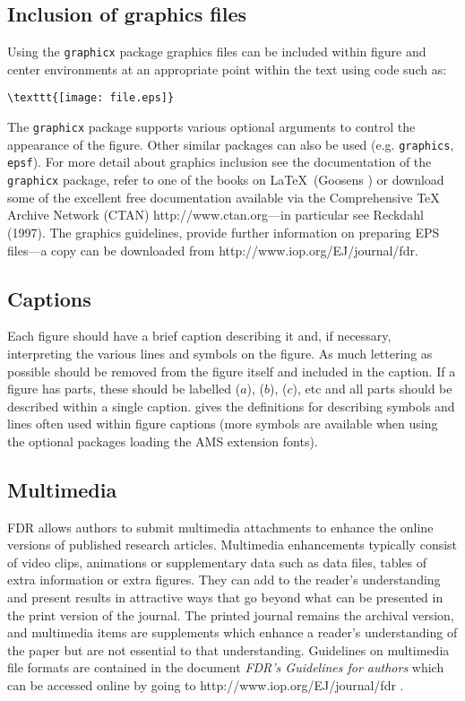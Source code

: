 \documentclass[12pt]{iopart}
\begin{document}
\subsection{Inclusion of graphics files\label{figinc}}
Using the \verb"graphicx" package graphics files can 
be included within figure and center environments at an 
appropriate point within the text using code such as:
\small\begin{verbatim}
\texttt{[image: file.eps]}
\end{verbatim}\normalsize
The \verb"graphicx" package supports various optional arguments
to control the appearance of the figure. Other similar 
packages can also be used (e.g. \verb"graphics", \verb"epsf"). 
For more detail about graphics inclusion see the documentation 
of the \verb"graphicx" package, refer to one of the books on \LaTeX\ (Goosens ) 
or download some of the excellent free documentation available via the Comprehensive
TeX Archive Network (CTAN) http://www.ctan.org---{in particular see Reckdahl (1997)}.
The graphics guidelines, provide further information on preparing EPS files---a copy
can be downloaded from http://www.iop.org/EJ/journal/fdr.

\subsection{Captions}
Each figure should have a brief caption describing it and, if 
necessary, interpreting the various lines and symbols on the figure. 
As much lettering as possible should be removed from the figure itself 
and included in the caption. If a figure has parts, these should be 
labelled ($a$), ($b$), ($c$), etc and all parts should be described 
within a single caption.  gives the definitions for describing 
symbols and lines often used within figure captions (more symbols are 
available when using the optional packages loading the AMS extension fonts).

\subsection{Multimedia}
FDR allows authors to submit multimedia attachments to 
enhance the online versions of published research articles. Multimedia 
enhancements typically consist of video clips, animations or supplementary 
data such as data files, tables of extra information or extra figures. They can 
add to the reader's understanding and present results in attractive ways that go 
beyond what can be presented in the print version of the journal. 
The printed journal remains the archival version, and multimedia items are 
supplements which enhance a reader's understanding of the paper but are not 
essential to that understanding. Guidelines on multimedia file formats 
are contained in the document {\it FDR's Guidelines for authors} which can be accessed 
online by going to http://www.iop.org/EJ/journal/fdr .
\end{document}
